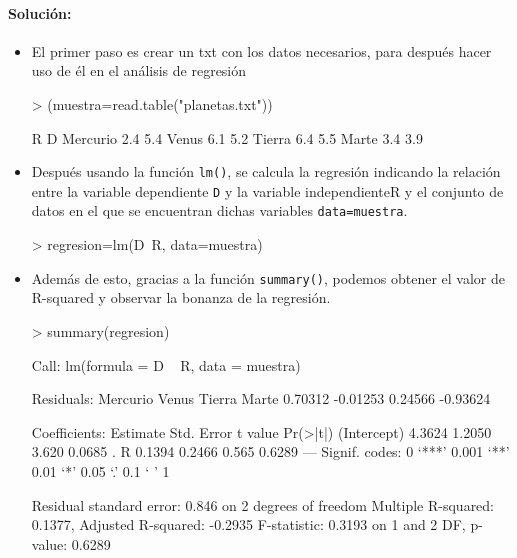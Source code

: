 \documentclass[a4paper, 12pt]{article}
\begin{document}
	\paragraph{Solución:}
	\begin{itemize}
	  \item El primer paso es crear un txt con los datos necesarios, para después hacer uso de él en el análisis de regresión
\begin{Schunk}
\begin{Sinput}
> (muestra=read.table("planetas.txt"))
\end{Sinput}
\begin{Soutput}
           R   D
Mercurio 2.4 5.4
Venus    6.1 5.2
Tierra   6.4 5.5
Marte    3.4 3.9
\end{Soutput}
\end{Schunk}
	
	  \item Después usando la función \texttt{lm()}, se calcula la regresión indicando la relación entre la variable dependiente \texttt{D} y la variable independiente{R} y el conjunto de datos en el que se encuentran dichas variables \texttt{data=muestra}.
\begin{Schunk}
\begin{Sinput}
> regresion=lm(D~R, data=muestra)  
\end{Sinput}
\end{Schunk}

    	  \item Además de esto, gracias a la función \texttt{summary()}, podemos obtener el valor de R-squared y observar la bonanza de la regresión.
\begin{Schunk}
\begin{Sinput}
> summary(regresion)
\end{Sinput}
\begin{Soutput}
Call:
lm(formula = D ~ R, data = muestra)

Residuals:
Mercurio    Venus   Tierra    Marte 
 0.70312 -0.01253  0.24566 -0.93624 

Coefficients:
            Estimate Std. Error t value Pr(>|t|)  
(Intercept)   4.3624     1.2050   3.620   0.0685 .
R             0.1394     0.2466   0.565   0.6289  
---
Signif. codes:  0 ‘***’ 0.001 ‘**’ 0.01 ‘*’ 0.05 ‘.’ 0.1 ‘ ’ 1

Residual standard error: 0.846 on 2 degrees of freedom
Multiple R-squared:  0.1377,	Adjusted R-squared:  -0.2935 
F-statistic: 0.3193 on 1 and 2 DF,  p-value: 0.6289
\end{Soutput}
\end{Schunk}


\end{itemize}
\end{document}
